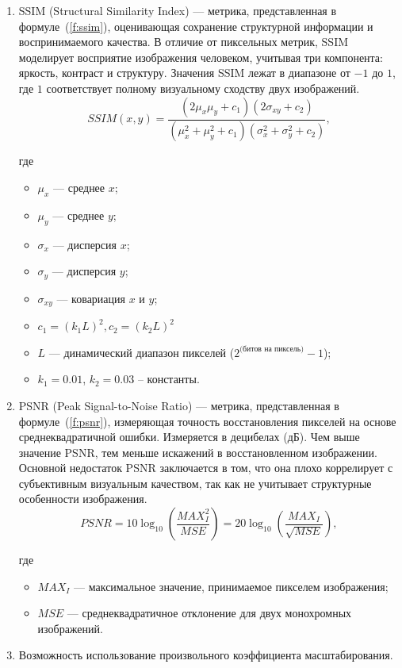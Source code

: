 \begin{enumerate}
    \item SSIM (Structural Similarity Index) --- метрика, представленная в формуле~(\ref{f:ssim}), оценивающая сохранение структурной информации и воспринимаемого качества. В отличие от пиксельных метрик, SSIM моделирует восприятие изображения человеком, учитывая три компонента: яркость, контраст и структуру. Значения SSIM лежат в диапазоне от $-1$ до $1$, где $1$ соответствует полному визуальному сходству двух изображений.
    \begin{equation}
        SSIM(x, y) = \frac{(2\mu_x\mu_y + c_1)(2\sigma_{xy} + c_2)}{(\mu_x^2+\mu_y^2+c_1)(\sigma_x^2+\sigma_y^2+c_2)},
        \label{f:ssim}
    \end{equation}

    где
    \begin{itemize}[label=---]
        \item $\mu_x$ --- среднее $x$;
        \item $\mu_y$ --- среднее $y$;
        \item $\sigma_x$ --- дисперсия $x$;
        \item $\sigma_y$ --- дисперсия $y$;
        \item $\sigma_{xy}$ --- ковариация $x$ и $y$;
        \item $c_1=(k_1L)^2, c_2=(k_2L)^2$
        \item $L$ ---  динамический диапазон пикселей ($2^{\text{(битов на пиксель)}}-1$);
        \item $k_1=0.01$, $k_2=0.03$ -- константы.
    \end{itemize}

    \item PSNR (Peak Signal-to-Noise Ratio) --- метрика, представленная в формуле~(\ref{f:psnr}), измеряющая точность восстановления пикселей на основе среднеквадратичной ошибки. Измеряется в децибелах (дБ). Чем выше значение PSNR, тем меньше искажений в восстановленном изображении. Основной недостаток PSNR заключается в том, что она плохо коррелирует с субъективным визуальным качеством, так как не учитывает структурные особенности изображения.
    \begin{equation}
    PSNR = 10\log_{10}\left(\frac{MAX^2_I}{MSE}\right) = 20\log_{10}\left(\frac{MAX_I}{\sqrt{MSE}}\right),
        \label{f:psnr}
    \end{equation}

    где
    \begin{itemize}[label=---]
        \item $MAX_I$ --- максимальное значение, принимаемое пикселем изображения;
        \item $MSE$ --- среднеквадратичное отклонение для двух монохромных изображений.
    \end{itemize}
    
    \item Возможность использование произвольного коэффициента масштабирования.
\end{enumerate}

